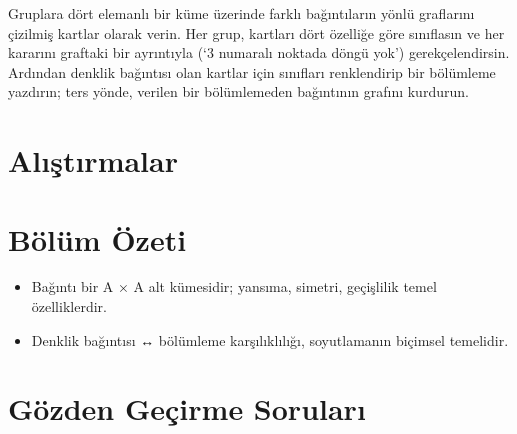\begin{sinif}
Gruplara dört elemanlı bir küme üzerinde farklı bağıntıların yönlü graflarını çizilmiş kartlar olarak verin. Her grup, kartları dört özelliğe göre sınıflasın ve her kararını graftaki bir ayrıntıyla (‘3 numaralı noktada döngü yok’) gerekçelendirsin. Ardından denklik bağıntısı olan kartlar için sınıfları renklendirip bir bölümleme yazdırın; ters yönde, verilen bir bölümlemeden bağıntının grafını kurdurun.
\end{sinif}

\section*{Alıştırmalar}






\section*{Bölüm Özeti}

\begin{itemize}\setlength{\itemsep}{2pt}\setlength{\parskip}{0pt}
\item Bağıntı bir A × A alt kümesidir; yansıma, simetri, geçişlilik temel özelliklerdir.
\item Denklik bağıntısı ↔ bölümleme karşılıklılığı, soyutlamanın biçimsel temelidir.
\end{itemize}

\section*{Gözden Geçirme Soruları}

